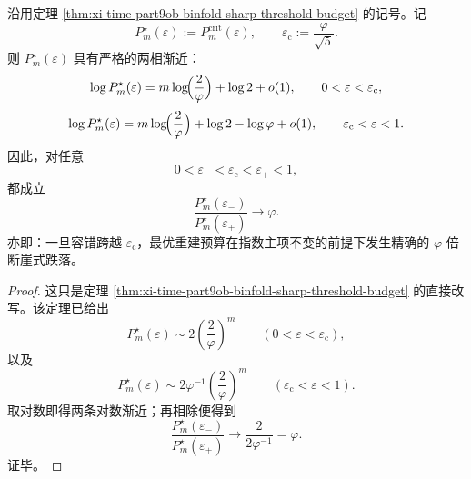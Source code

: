 \begin{theorem}\label{thm:xi-time-part9zr-reconstruction-budget-phi-cliff}
沿用定理 \ref{thm:xi-time-part9ob-binfold-sharp-threshold-budget} 的记号。记
\[
P_m^\star(\varepsilon):=P_m^{\mathrm{crit}}(\varepsilon),
\qquad
\varepsilon_{\mathrm c}:=\frac{\varphi}{\sqrt5}.
\]
则 \(P_m^\star(\varepsilon)\) 具有严格的两相渐近：
\[
\log P_m^\star(\varepsilon)
=
m\log\!\Bigl(\frac{2}{\varphi}\Bigr)+\log 2+o(1),
\qquad
0<\varepsilon<\varepsilon_{\mathrm c},
\]
\[
\log P_m^\star(\varepsilon)
=
m\log\!\Bigl(\frac{2}{\varphi}\Bigr)+\log 2-\log\varphi+o(1),
\qquad
\varepsilon_{\mathrm c}<\varepsilon<1.
\]
因此，对任意
\[
0<\varepsilon_-<\varepsilon_{\mathrm c}<\varepsilon_+<1,
\]
都成立
\[
\frac{P_m^\star(\varepsilon_-)}{P_m^\star(\varepsilon_+)}
\longrightarrow
\varphi.
\]
亦即：一旦容错跨越 \(\varepsilon_{\mathrm c}\)，最优重建预算在指数主项不变的前提下发生精确的 \(\varphi\)-倍断崖式跌落。
\end{theorem}
\begin{proof}
这只是定理 \ref{thm:xi-time-part9ob-binfold-sharp-threshold-budget} 的直接改写。该定理已给出
\[
P_m^\star(\varepsilon)
\sim
2\left(\frac{2}{\varphi}\right)^m
\qquad
(0<\varepsilon<\varepsilon_{\mathrm c}),
\]
以及
\[
P_m^\star(\varepsilon)
\sim
2\varphi^{-1}\left(\frac{2}{\varphi}\right)^m
\qquad
(\varepsilon_{\mathrm c}<\varepsilon<1).
\]
取对数即得两条对数渐近；再相除便得到
\[
\frac{P_m^\star(\varepsilon_-)}{P_m^\star(\varepsilon_+)}
\longrightarrow
\frac{2}{2\varphi^{-1}}
=
\varphi.
\]
证毕。
\end{proof}

